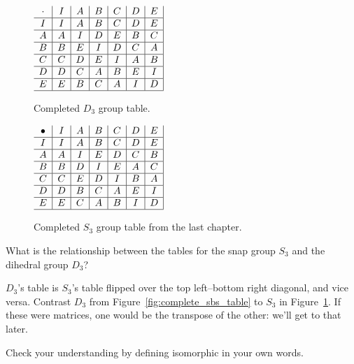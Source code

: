 \documentclass[../gatm_answers.tex]{subfiles}
\begin{document}
\begin{figure}[h]
\begin{minipage}{0.45\textwidth}
\centering
$\begin{array}{c|c|c|c|c|c|c|}
\cdot & I & A & B & C & D & E \\ \hline
I & I & A & B & C & D & E \\ \hline
A & A & I & D & E & B & C \\ \hline
B & B & E & I & D & C & A \\ \hline
C & C & D & E & I & A & B \\ \hline
D & D & C & A & B & E & I \\ \hline
E & E & B & C & A & I & D \\ \hline
\end{array}$
\caption{Completed $D_3$ group table.}
\label{fig:complete_sbs_table}
\end{minipage}\hfill
\begin{minipage}{0.45\textwidth}
\centering
$\begin{array}{c|c|c|c|c|c|c|}
\bullet & I & A & B & C & D & E \\ \hline
I & I & A & B & C & D & E \\ \hline
A & A & I & E & D & C & B \\ \hline
B & B & D & I & E & A & C \\ \hline
C & C & E & D & I & B & A \\ \hline
D & D & B & C & A & E & I \\ \hline
E & E & C & A & B & I & D \\ \hline
\end{array}$
\caption{Completed $S_3$ group table from the last chapter.}
\label{fig:complete_sts_table}
\end{minipage}
\end{figure}

\begin{outer_problem}
\item What is the relationship between the tables for the snap group $S_3$ and the dihedral group $D_3$?
\end{outer_problem}

$D_3$'s table is $S_3$'s table flipped over the top left--bottom right diagonal, and vice versa. Contrast $D_3$ from Figure~\ref{fig:complete_sbs_table} to $S_3$ in Figure~\ref{fig:complete_sts_table}. If these were matrices, one would be the transpose of the other: we'll get to that later.

\begin{outer_problem}
\item Check your understanding by defining isomorphic in your own words.
\end{outer_problem}
\end{document}
